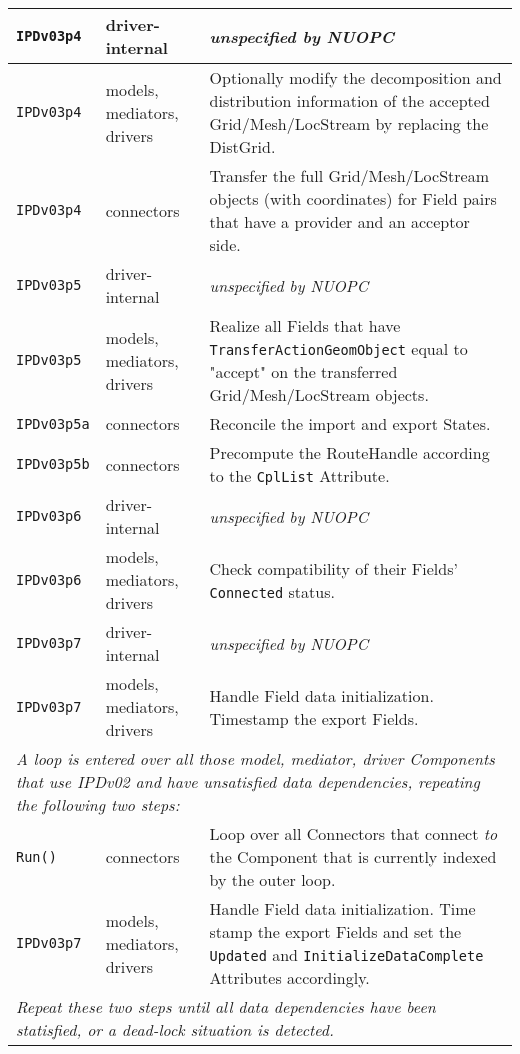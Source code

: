 \begin{longtable}[h]{|p{}|p{}|p{}|}
     {\tt IPDv03p4} & driver-internal             & {\em unspecified by NUOPC}\\ \hline
     {\tt IPDv03p4} & models, mediators, drivers  & Optionally modify the decomposition and distribution information of the accepted Grid/Mesh/LocStream by replacing the DistGrid.\\ \hline
     {\tt IPDv03p4} & connectors                  & Transfer the full Grid/Mesh/LocStream objects (with coordinates) for Field pairs that have a provider and an acceptor side.\\ \hline
     {\tt IPDv03p5} & driver-internal             & {\em unspecified by NUOPC}\\ \hline
     {\tt IPDv03p5} & models, mediators, drivers  & Realize all Fields that have {\tt TransferActionGeomObject} equal to "accept" on the transferred Grid/Mesh/LocStream objects.\\ \hline
     {\tt IPDv03p5a}& connectors                  & Reconcile the import and export States.\\ \hline
     {\tt IPDv03p5b}& connectors                  & Precompute the RouteHandle according to the {\tt CplList} Attribute.\\ \hline
     {\tt IPDv03p6} & driver-internal             & {\em unspecified by NUOPC}\\ \hline
     {\tt IPDv03p6} & models, mediators, drivers  & Check compatibility of their Fields' {\tt Connected} status.\\ \hline
     {\tt IPDv03p7} & driver-internal             & {\em unspecified by NUOPC}\\ \hline
     {\tt IPDv03p7} & models, mediators, drivers  & Handle Field data initialization. Timestamp the export Fields.\\ \hline
     \multicolumn{3}{|p{13.5cm}|}{\it A loop is entered over all those model, mediator, driver Components that use IPDv02 and have
     unsatisfied data dependencies, repeating the following two steps:}\\ \hline
     {\tt Run()}    & connectors                  & Loop over all Connectors that connect {\it to} the Component that is currently indexed by the outer loop.\\ \hline
     {\tt IPDv03p7} & models, mediators, drivers  & Handle Field data initialization. Time stamp the export Fields and set the {\tt Updated} and {\tt InitializeDataComplete} Attributes accordingly.\\ \hline
     \multicolumn{3}{|p{13.5cm}|}{\it Repeat these two steps until all data
     dependencies have been statisfied, or a dead-lock situation is detected.}\\ 
     \hline\hline
\end{longtable}

